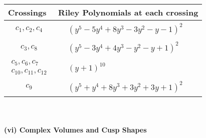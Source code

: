 \documentclass[1p]{elsarticle_modified}
\theoremstyle{definition}
\begin{document}
\begin{tabular}{m{50pt}|m{274pt}}
Crossings & \hspace{64pt}Riley Polynomials at each crossing \\
\hline $$\begin{aligned}c_{1},c_{2},c_{4}\end{aligned}$$&$\begin{aligned}
&(y^5-5 y^4+8 y^3-3 y^2- y-1)^2
\end{aligned}$\\
\hline $$\begin{aligned}c_{3},c_{8}\end{aligned}$$&$\begin{aligned}
&(y^5-3 y^4+4 y^3- y^2- y+1)^2
\end{aligned}$\\
\hline $$\begin{aligned}c_{5},c_{6},c_{7}\\c_{10},c_{11},c_{12}\end{aligned}$$&$\begin{aligned}
&(y+1)^{10}
\end{aligned}$\\
\hline $$\begin{aligned}c_{9}\end{aligned}$$&$\begin{aligned}
&(y^5+y^4+8 y^3+3 y^2+3 y+1)^2
\end{aligned}$\\
\hline
\end{tabular}\\~\\
\newpage\flushleft \textbf{(vi) Complex Volumes and Cusp Shapes}
\end{document}
